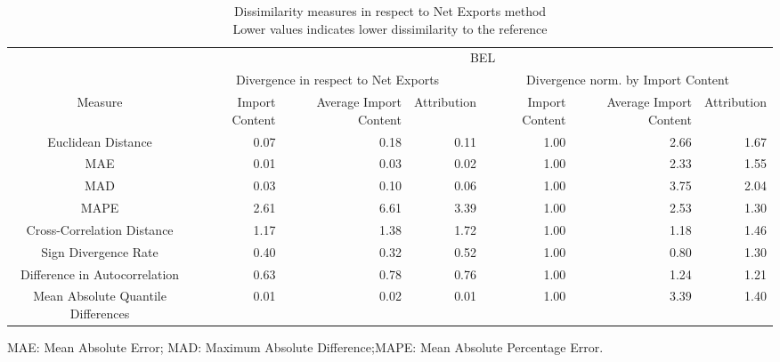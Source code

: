 \begin{table}[t]
\caption*{
{\large Dissimilarity measures in respect to Net Exports method} \\ 
{\small Lower values indicates lower dissimilarity to the reference}
} 
\fontsize{15.0pt}{18.0pt}\selectfont
\begin{tabular*}{\linewidth}{@{\extracolsep{\fill}}crrrrrr}
\toprule
 & \multicolumn{6}{c}{BEL} \\ 
\cmidrule(lr){2-7}
 & \multicolumn{3}{c}{Divergence in respect to Net Exports} & \multicolumn{3}{c}{Divergence norm. by Import Content} \\ 
\cmidrule(lr){2-4} \cmidrule(lr){5-7}
Measure & Import Content & Average Import Content & Attribution & Import Content & Average Import Content & Attribution \\ 
\midrule\addlinespace[2.5pt]
Euclidean Distance & 0.07 & 0.18 & 0.11 & 1.00 & 2.66 & 1.67 \\ 
MAE & 0.01 & 0.03 & 0.02 & 1.00 & 2.33 & 1.55 \\ 
MAD & 0.03 & 0.10 & 0.06 & 1.00 & 3.75 & 2.04 \\ 
MAPE & 2.61 & 6.61 & 3.39 & 1.00 & 2.53 & 1.30 \\ 
Cross-Correlation Distance & 1.17 & 1.38 & 1.72 & 1.00 & 1.18 & 1.46 \\ 
Sign Divergence Rate & 0.40 & 0.32 & 0.52 & 1.00 & 0.80 & 1.30 \\ 
Difference in Autocorrelation & 0.63 & 0.78 & 0.76 & 1.00 & 1.24 & 1.21 \\ 
Mean Absolute Quantile Differences & 0.01 & 0.02 & 0.01 & 1.00 & 3.39 & 1.40 \\ 
\bottomrule
\end{tabular*}
\begin{minipage}{\linewidth}
MAE: Mean Absolute Error; MAD: Maximum Absolute Difference;MAPE: Mean Absolute Percentage Error.\\
\end{minipage}
\end{table}

